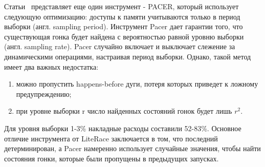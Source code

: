 Статьи~\cite{Bond:2010:PLDI,Bond:2010} представляет еще один инструмент - PACER, который использует следующую оптимизацию: доступы к памяти учитываются только в период выборки (англ. sampling period).
Инструмент Pacer дает гарантии того, что существующая гонка будет найдена с вероятностью равной уровню выборки (англ. sampling rate).
Pacer случайно включает и выключает слежение за динамическими операциями, настраивая период выборки.
Однако, такой метод имеет два важных недостатка:
\begin{enumerate}
\item можно пропустить happens-before дуги, потеря которых приведет к ложному предупреждению;
\item при уровне выборки r число найденных состояний гонок будет лишь $r^2$. 
\end{enumerate}
Для уровня выборки 1-3\% накладные расходы составили 52-83\%.
Основное отличие инструмента от LiteRace заключается в том, что последний  детерминирован, а Pacer намеренно использует случайные значения, чтобы найти состояния гонки, которые были пропущены в предыдущих запусках.

